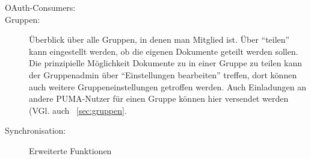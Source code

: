 \begin{description}
   \item[OAuth-Consumers:]
   \item[Gruppen:]
Überblick über alle Gruppen, in denen man Mitglied ist. Über \enquote{teilen} kann eingestellt werden, ob die eigenen Dokumente geteilt werden sollen. Die prinzipielle Möglichkeit Dokumente zu in einer Gruppe zu teilen kann der Gruppenadmin über \enquote{Einstellungen bearbeiten} treffen, dort können auch weitere Gruppeneinstellungen getroffen werden. Auch Einladungen an andere PUMA-Nutzer für einen Gruppe können hier versendet werden (VGl. auch ~\autoref{sec:gruppen}.  
   \item[Synchronisation:]
\end{description}
    \begin{figure}[h!]
 \centering
 \caption{Erweiterte Funktionen}
 \label{fig:erweiterteFunktionen}
\end{figure} 
